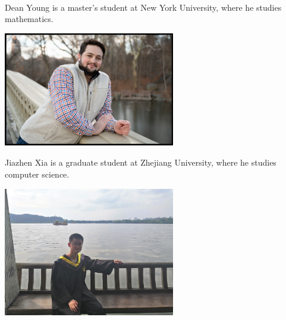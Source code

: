 \documentclass{book}
\theoremstyle{definition}
\newcounter{lcounter}
\begin{document}
\newpage 
\ \\
\ \\
\ \\
\ \\
\ \\               
\ \\
\begin{center}
\begin{tcolorbox}[width=5in,colback={white},title={\begin{center}\texttt{About the Author} \addtocounter{lcounter}{1}  \end{center}},colbacktitle=Yellow,coltitle=black]
Dean Young is a master's student at New York University, where he studies mathematics. \\
\begin{center}
\includegraphics[width=7.5cm,height=5cm]{about.jpg}
\end{center}
\end{tcolorbox}
\end{center}

\begin{center}
\begin{tcolorbox}[width=5in,colback={white},title={\begin{center}\texttt{About the Author} \addtocounter{lcounter}{1}  \end{center}},colbacktitle=Yellow,coltitle=black]
Jiazhen Xia is a graduate student at Zhejiang University, where he studies computer science. \\
\begin{center}
\includegraphics[width=7.5cm]{about2.jpg}
\end{center}
\end{tcolorbox}
\end{center}
\newpage
\ \\
\thispagestyle{empty}
\pagecolor{Yellow}
\end{document}
